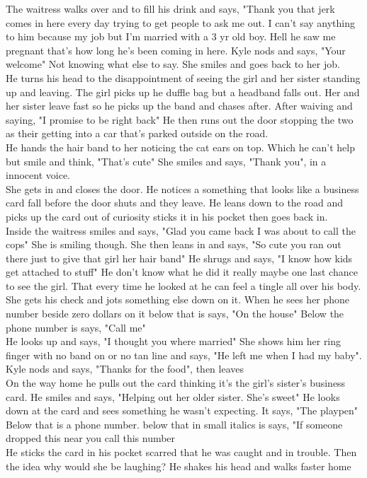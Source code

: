 \documentclass {article}[12pt]
\begin{document}
The waitress walks over and to fill his drink and says, "Thank you that jerk comes in here every day trying to get people to ask me out. I can't say anything to him because my job but I'm married with a 3 yr old boy. Hell he saw me pregnant that's how long he's been coming in here. Kyle nods and says, "Your welcome" Not knowing what else to say. She smiles and goes back to her job.\\

He turns his head to the disappointment of seeing the girl and her sister standing up and leaving. The girl picks up he duffle bag but a headband falls out. Her and her sister leave fast so he picks up the band and chases after. After waiving and saying, "I promise to be right back" He then runs out the door stopping the two as their getting into a car that's parked outside on the road.\\

He hands the hair band to her noticing the cat ears on top. Which he can't help but smile and think, "That's cute" She smiles and says, "Thank you", in a innocent voice.\\

She gets in and closes the door. He notices a something that looks like a business card fall before the door shuts and they leave. He leans down to the road and picks up the card out of curiosity sticks it in his pocket then goes back in.\\

Inside the waitress smiles and says, "Glad you came back I was about to call the cops" She is smiling though. She then leans in and says, "So cute you ran out there just to give that girl her hair band" He shrugs and says, "I know how kids get attached to stuff" He don't know what he did it really maybe one last chance to see the girl. That every time he looked at he can feel a tingle all over his body.\\

She gets his check and jots something else down on it. When he sees her phone number beside zero dollars on it below that is says, "On the house" Below the phone number is says, "Call me" \\

He looks up and says, "I thought you where married" She shows him her ring finger with no band on or no tan line and says, "He left me when I had my baby". Kyle nods and says, "Thanks for the food", then leaves\\

On the way home he pulls out the card thinking it's the girl's sister's business card. He smiles and says, "Helping out her older sister. She's sweet" He looks down at the card and sees something he wasn't expecting. It says, "The playpen" Below that is a phone number. below that in small italics is says, "If someone dropped this near you call this number\\

He sticks the card in his pocket scarred that he was caught and in trouble. Then the idea why would she be laughing? He shakes his head and walks faster home\\
\end{document}
